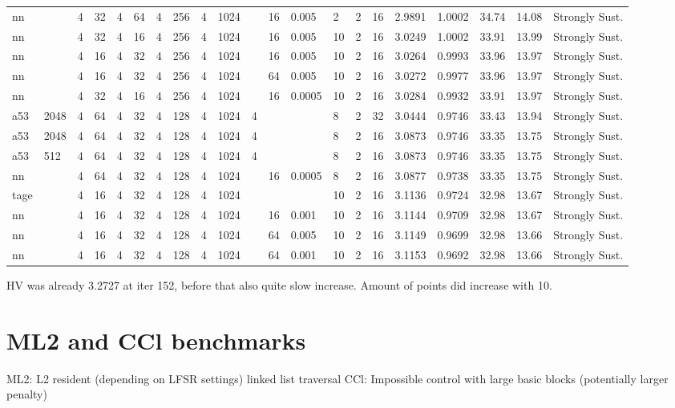 \documentclass[11pt]{article}
\begin{document}
\begin{itemize}
\begin{table}[H]
{\begin{tabular}{lllllllllllllllllllll}
nn &  & 4 & 32 & 4 & 64 & 4 & 256 & 4 & 1024 &  & 16 & 0.005 & 2 & 2 & 16 & 2.9891 & 1.0002 & 34.74 & 14.08 & Strongly Sust. \\
nn &  & 4 & 32 & 4 & 16 & 4 & 256 & 4 & 1024 &  & 16 & 0.005 & 10 & 2 & 16 & 3.0249 & 1.0002 & 33.91 & 13.99 & Strongly Sust. \\
nn &  & 4 & 16 & 4 & 32 & 4 & 256 & 4 & 1024 &  & 16 & 0.005 & 10 & 2 & 16 & 3.0264 & 0.9993 & 33.96 & 13.97 & Strongly Sust. \\
nn &  & 4 & 16 & 4 & 32 & 4 & 256 & 4 & 1024 &  & 64 & 0.005 & 10 & 2 & 16 & 3.0272 & 0.9977 & 33.96 & 13.97 & Strongly Sust. \\
nn &  & 4 & 32 & 4 & 16 & 4 & 256 & 4 & 1024 &  & 16 & 0.0005 & 10 & 2 & 16 & 3.0284 & 0.9932 & 33.91 & 13.97 & Strongly Sust. \\
a53 & 2048 & 4 & 64 & 4 & 32 & 4 & 128 & 4 & 1024 & 4 &  &  & 8 & 2 & 32 & 3.0444 & 0.9746 & 33.43 & 13.94 & Strongly Sust. \\
a53 & 2048 & 4 & 64 & 4 & 32 & 4 & 128 & 4 & 1024 & 4 &  &  & 8 & 2 & 16 & 3.0873 & 0.9746 & 33.35 & 13.75 & Strongly Sust. \\
a53 & 512 & 4 & 64 & 4 & 32 & 4 & 128 & 4 & 1024 & 4 &  &  & 8 & 2 & 16 & 3.0873 & 0.9746 & 33.35 & 13.75 & Strongly Sust. \\
nn &  & 4 & 64 & 4 & 32 & 4 & 128 & 4 & 1024 &  & 16 & 0.0005 & 8 & 2 & 16 & 3.0877 & 0.9738 & 33.35 & 13.75 & Strongly Sust. \\
tage &  & 4 & 16 & 4 & 32 & 4 & 128 & 4 & 1024 &  &  &  & 10 & 2 & 16 & 3.1136 & 0.9724 & 32.98 & 13.67 & Strongly Sust. \\
nn &  & 4 & 16 & 4 & 32 & 4 & 128 & 4 & 1024 &  & 16 & 0.001 & 10 & 2 & 16 & 3.1144 & 0.9709 & 32.98 & 13.67 & Strongly Sust. \\
nn &  & 4 & 16 & 4 & 32 & 4 & 128 & 4 & 1024 &  & 64 & 0.005 & 10 & 2 & 16 & 3.1149 & 0.9699 & 32.98 & 13.66 & Strongly Sust. \\
nn &  & 4 & 16 & 4 & 32 & 4 & 128 & 4 & 1024 &  & 64 & 0.001 & 10 & 2 & 16 & 3.1153 & 0.9692 & 32.98 & 13.66 & Strongly Sust. \\
\bottomrule
\end{tabular}
}
\end{table}
\end{itemize}

HV was already 3.2727 at iter 152, before that also quite slow increase. Amount of points did increase with 10.
\section{ML2 and CCl benchmarks}
ML2: L2 resident (depending on LFSR settings) linked list traversal
\newline
CCl: Impossible control with large basic blocks (potentially larger penalty)
\end{document}
